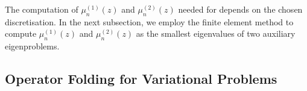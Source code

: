 



The computation of $\mu_n^{(1)}(z)$ and $\mu_n^{(2)}(z)$ needed for  depends on the chosen discretisation. In the next subsection, we employ the finite element method to compute $\mu_n^{(1)}(z)$ and $\mu_n^{(2)}(z)$ as the smallest eigenvalues of two auxiliary eigenproblems.







\subsection{Operator Folding for Variational Problems} \label{Fix matt}




